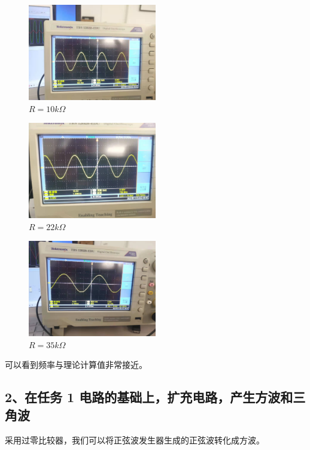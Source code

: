 \documentclass[UTF8]{ctexart}
\begin{document}
\begin{figure}[H]
        \centering
        \includegraphics[width = 0.5\textwidth]{1-1-10k-r.jpg}
        \caption{$R=10k \Omega$}
\end{figure}
\begin{figure}[H]
        \centering
        \includegraphics[width = 0.5\textwidth]{1-1-22k-r.jpg}
        \caption{$R=22k \Omega$}
\end{figure}
\begin{figure}[H]
        \centering
        \includegraphics[width = 0.5\textwidth]{1-1-35k-r.jpg}
        \caption{$R=35k \Omega$}
\end{figure}

可以看到频率与理论计算值非常接近。

\subsection*{2、在任务 1 电路的基础上，扩充电路，产生方波和三角波}

采用过零比较器，我们可以将正弦波发生器生成的正弦波转化成方波。
\end{document}
